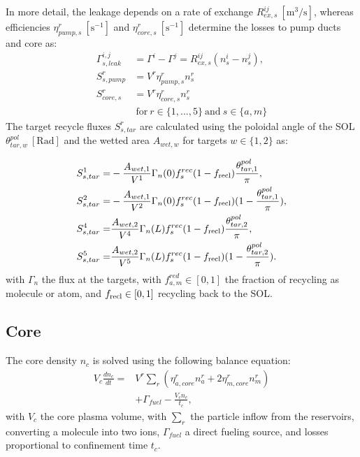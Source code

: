 \documentclass[amsmath,amssymb,a4]{revtex4-2}
\begin{document}
\noindent In more detail, the leakage depends on a rate of exchange $R^{ij}_{ex,s}~\mathrm{[m^3/s]}$, whereas efficiencies $\eta^r_{pump,s}~\mathrm{[s^{-1}]}$ and $\eta^r_{core,s}~\mathrm{[s^{-1}]}$ determine the losses to pump ducts and core as:
\begin{equation}
\begin{aligned}
   \Gamma^{i,j}_{s,leak} &= \Gamma^i - \Gamma^j = R^{ij}_{ex,s}(n_s^i-n_s^j), \\
     S_{s,pump}^r & = V^r\eta_{pump,s}^r n_s^r  \\  
    S_{core,s}^r & = V^r\eta_{core,s}^r n_s^r  \\
     & ~\text{for} ~r \in \{ 1, ...,5 \} ~\text{and}~ s \in \{a,m\} 
   \label{eq: neutral sources}
\end{aligned}
\end{equation}
\noindent The target recycle fluxes $S^r_{s,tar}$ are calculated using the poloidal angle of the SOL $\theta^{pol}_{tar,w}~\mathrm{[Rad]}$ and the wetted area $A_{wet,w}$ for targets $w \in \{1,2\}$ as:

\begin{equation}
\begin{aligned}
    S^1_{s,tar} =& -\frac{A_{wet,1}}{V^1}\Gamma_n(0)f^{rec}_{s}(1-f_{\rm recl})\frac{\theta^{pol}_{tar,1}}{\pi}, \\
    S^2_{s,tar} =& -\frac{A_{wet,1}}{V^2}\Gamma_n(0)f^{rec}_{s}(1-f_{\rm recl})(1 -\frac{\theta^{pol}_{tar,1}}{\pi}), \\
    S^4_{s,tar} =& \frac{A_{wet,2}}{V^4}\Gamma_n(L)f^{rec}_{s}(1-f_{\rm recl})\frac{\theta^{pol}_{tar,2}}{\pi}, \\
    S^5_{s,tar} =& \frac{A_{wet,2}}{V^5}\Gamma_n(L)f^{rec}_{s}(1-f_{\rm recl})(1 -\frac{\theta^{pol}_{tar,2}}{\pi}).
    \end{aligned}
\end{equation}
with $\Gamma_n$ the flux at the targets, with $ f^{red}_{a,m} \in [0,1]$ the fraction of recycling as molecule or atom, and $f_{\rm recl}\in [0,1]$  recycling back to the SOL. %

\subsection{Core}
The core density $n_{c}$ is solved using the following balance equation:
\begin{equation}
\begin{aligned}
    V_c\frac{dn_{c}}{dt} =& V^r \sum_r (\eta^r_{a,core}n^r_{a} + 2\eta^r_{m,core}n^r_{m})\\
    &+\Gamma_{fuel}-\frac{V_c n_c}{t_c}, 
\end{aligned}
    \label{eq:core bal}
\end{equation}
with $V_c$ the core plasma volume, with $\sum_r$ the particle inflow from the reservoirs, converting a molecule into two ions, $\Gamma_{fuel}$ a direct fueling source, and losses proportional to confinement time $t_c$.
\end{document}
